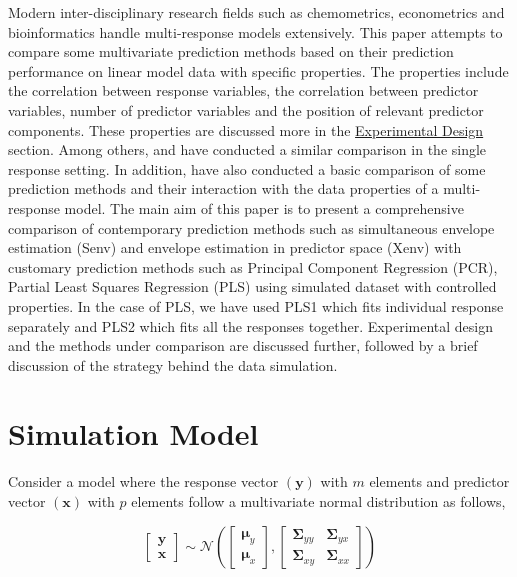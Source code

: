 \documentclass[review]{elsarticle}
\begin{document}
Modern inter-disciplinary research fields such as chemometrics, econometrics and bioinformatics handle multi-response models extensively. This paper attempts to compare some multivariate prediction methods based on their prediction performance on linear model data with specific properties. The properties include the correlation between response variables, the correlation between predictor variables, number of predictor variables and the position of relevant predictor components. These properties are discussed more in the \protect\hyperlink{experimental-design}{Experimental Design} section. Among others, \citet{saebo2015simrel} and \citet{Alm_y_1996} have conducted a similar comparison in the single response setting. In addition, \citet{Rimal2018} have also conducted a basic comparison of some prediction methods and their interaction with the data properties of a multi-response model. The main aim of this paper is to present a comprehensive comparison of contemporary prediction methods such as simultaneous envelope estimation (Senv) \citep{cook2015simultaneous} and envelope estimation in predictor space (Xenv) \citep{cook2010envelope} with customary prediction methods such as Principal Component Regression (PCR), Partial Least Squares Regression (PLS) using simulated dataset with controlled properties. In the case of PLS, we have used PLS1 which fits individual response separately and PLS2 which fits all the responses together. Experimental design and the methods under comparison are discussed further, followed by a brief discussion of the strategy behind the data simulation.

\hypertarget{simulation-model}{%
\section{Simulation Model}\label{simulation-model}}

Consider a model where the response vector \((\mathbf{y})\) with \(m\) elements and predictor vector \((\mathbf{x})\) with \(p\) elements follow a multivariate normal distribution as follows,

\begin{equation}
  \begin{bmatrix}
    \mathbf{y} \\ \mathbf{x}
  \end{bmatrix} \sim \mathcal{N}
  \left(
    \begin{bmatrix}
      \boldsymbol{\mu}_y \\
      \boldsymbol{\mu}_x
    \end{bmatrix},
    \begin{bmatrix}
    \boldsymbol{\Sigma}_{yy} & \boldsymbol{\Sigma}_{yx} \\
    \boldsymbol{\Sigma}_{xy} & \boldsymbol{\Sigma}_{xx}
    \end{bmatrix}
  \right)
  \label{eq:model-1}
\end{equation}
\end{document}
